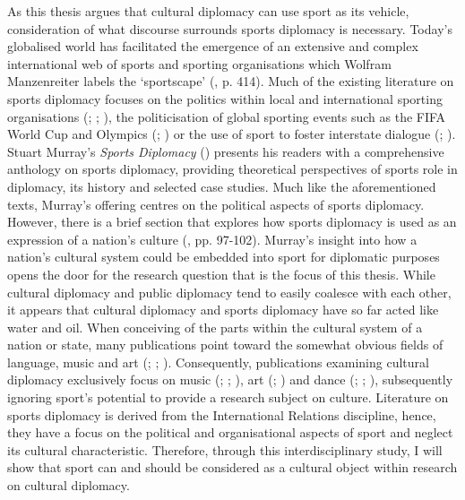 As this thesis argues that cultural diplomacy can use sport as its vehicle, consideration of what discourse surrounds sports diplomacy is necessary. Today’s globalised world has facilitated the emergence of an extensive and complex international web of sports and sporting organisations which Wolfram Manzenreiter labels the ‘sportscape’ (\citeyear{manzenreiter2008}, p. 414). Much of the existing literature on sports diplomacy focuses on the politics within local and international sporting organisations (\cite{holt1999}; \cite{tomlinson2016}; \cite{cooley2018}), the politicisation of global sporting events such as the FIFA World Cup and Olympics (\cite{xu2008}; \cite{dowse2018}) or the use of sport to foster interstate dialogue (\cite{rowe2018}; \cite{shuman2018}). Stuart Murray’s \textit{Sports Diplomacy} (\citeyear{murray2018}) presents his readers with a comprehensive anthology on sports diplomacy, providing theoretical perspectives of sports role in diplomacy, its history and selected case studies. Much like the aforementioned texts, Murray’s offering centres on the political aspects of sports diplomacy. However, there is a brief section that explores how sports diplomacy is used as an expression of a nation’s culture (\citeyear{murray2018}, pp. 97-102). Murray’s insight into how a nation’s cultural system could be embedded into sport for diplomatic purposes opens the door for the research question that is the focus of this thesis. While cultural diplomacy and public diplomacy tend to easily coalesce with each other, it appears that cultural diplomacy and sports diplomacy have so far acted like water and oil. When conceiving of the parts within the cultural system of a nation or state, many publications point toward the somewhat obvious fields of language, music and art (\cite{hanna1987}; \cite{blackingetal1995}; \cite{clifford1998}). Consequently, publications examining cultural diplomacy exclusively focus on music (\cite{fosler-lussier2015}; \cite{mikkonensuutari2016}; \cite{saito2020}), art (\cite{barnhisel2015}; \cite{mikkonensuutari2016}) and dance (\cite{prevots1998}; \cite{kodat2014}; \cite{mcdaniel2014}), subsequently ignoring sport’s potential to provide a research subject on culture. Literature on sports diplomacy is derived from the International Relations discipline, hence, they have a focus on the political and organisational aspects of sport and neglect its cultural characteristic. Therefore, through this interdisciplinary study, I will show that sport can and should be considered as a cultural object within research on cultural diplomacy.

